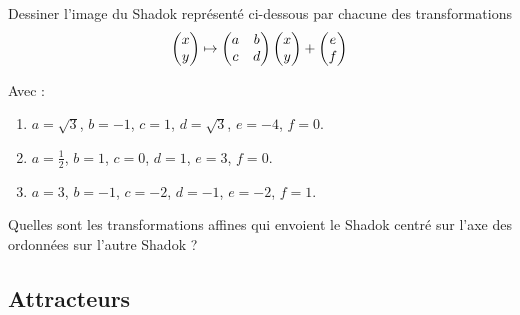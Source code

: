 \documentclass[11pt,class=report,crop=false]{standalone}
\begin{document}
\begin{exercicecours}
Dessiner l'image du Shadok représenté ci-dessous par chacune des transformations
$$\begin{pmatrix}x \\ y\end{pmatrix} \mapsto \begin{pmatrix}a & b \\ c & d \\  \end{pmatrix}
\begin{pmatrix}x \\ y\end{pmatrix} + \begin{pmatrix}e \\ f\end{pmatrix}$$



Avec :
\begin{enumerate}
 \item $a=\sqrt 3$, $b=-1$, $c=1$, $d=\sqrt 3$, $e=-4$, $f=0$.
 \item $a=\frac 12$, $b=1$, $c=0$, $d=1$, $e=3$, $f=0$.
 \item $a=3$, $b=-1$, $c=-2$, $d=-1$, $e=-2$, $f=1$.
\end{enumerate}
\end{exercicecours}


\begin{exercicecours}
Quelles sont les transformations affines qui envoient le Shadok centré sur l'axe des ordonnées sur l'autre Shadok ?
\begin{center}
\end{center}

\begin{center}
\end{center}
\end{exercicecours}



\subsection{Attracteurs}
\end{document}
